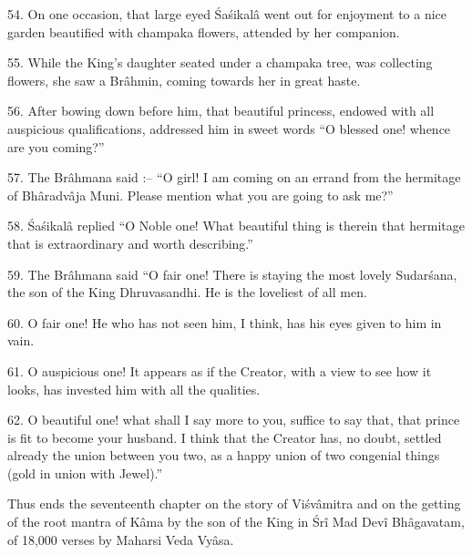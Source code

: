 54. On one occasion, that large eyed \'Sa\'sikal\^a went out for enjoyment to a nice garden beautified with champaka flowers, attended by her companion.

55. While the King's daughter seated under a champaka tree, was collecting flowers, she saw a Br\^ahmin, coming towards her in great haste.

56. After bowing down before him, that beautiful princess, endowed with all auspicious qualifications, addressed him in sweet words ``O blessed one! whence are you coming?''

57. The Br\^ahmana said :-- ``O girl! I am coming on an errand from the hermitage of Bh\^aradv\^aja Muni. Please mention what you are going to ask me?''

58. \'Sa\'sikal\^a replied ``O Noble one! What beautiful thing is therein that hermitage that is extraordinary and worth describing.''

59. The Br\^ahmana said ``O fair one! There is staying the most lovely Sudar\'sana, the son of the King Dhruvasandhi. He is the loveliest of all men.

60. O fair one! He who has not seen him, I think, has his eyes given to him in vain.

61. O auspicious one! It appears as if the Creator, with a view to see how it looks, has invested him with all the qualities.

62. O beautiful one! what shall I say more to you, suffice to say that, that prince is fit to become your husband. I think that the Creator has, no doubt, settled already the union between you two, as a happy union of two congenial things (gold in union with Jewel).''

Thus ends the seventeenth chapter on the story of Vi\'sv\^amitra and on the getting of the root mantra of K\^ama by the son of the King in \'Sr\^i Mad Dev\^i Bh\^agavatam, of 18,000 verses by Maharsi Veda Vy\^asa.